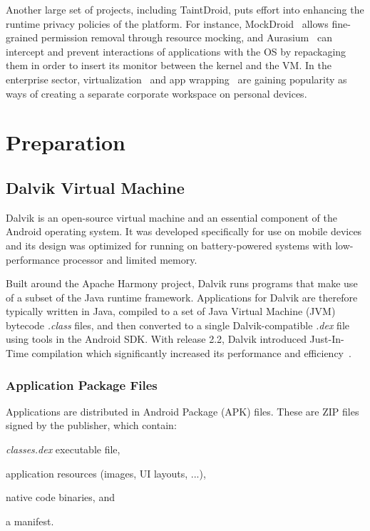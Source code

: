 \documentclass[12pt,twoside,notitlepage]{report}
\begin{document}
Another large set of projects, including TaintDroid, puts effort into enhancing the runtime privacy policies of the platform. For instance, MockDroid~\cite{Beresford:2011:MTP:2184489.2184500} allows fine-grained permission removal through resource mocking, and Aurasium~\cite{Xu:2012:APP:2362793.2362820} can intercept and prevent interactions of applications with the OS by repackaging them in order to insert its monitor between the kernel and the VM. In the enterprise sector, virtualization~\cite{web:Virtualization} and app wrapping~\cite{web:AppWrapping} are gaining popularity as ways of creating a separate corporate workspace on personal devices.

\cleardoublepage
\chapter{Preparation}

\section{Dalvik Virtual Machine}

Dalvik is an open-source virtual machine and an essential component of the Android operating system. It was developed specifically for use on mobile devices and its design was optimized for running on battery-powered systems with low-performance processor and limited memory. 

Built around the Apache Harmony project, Dalvik runs programs that make use of a subset of the Java runtime framework. Applications for Dalvik are therefore typically written in Java, compiled to a set of Java Virtual Machine (JVM) bytecode \emph{.class} files, and then converted to a single Dalvik-compatible \emph{.dex} file~\cite{web:DalvikDex} using tools in the Android SDK. With release 2.2, Dalvik introduced Just-In-Time compilation which significantly increased its performance and efficiency~\cite{web:DalvikJit}.

\subsection{Application Package Files}

Applications are distributed in Android Package (APK) files. These are ZIP files signed by the publisher, which contain:
\begin{inparaenum}[(i)]
\item \emph{classes.dex} executable file,
\item application resources (images, UI layouts, ...),
\item native code binaries, and
\item a manifest.
\end{inparaenum}
\end{document}
